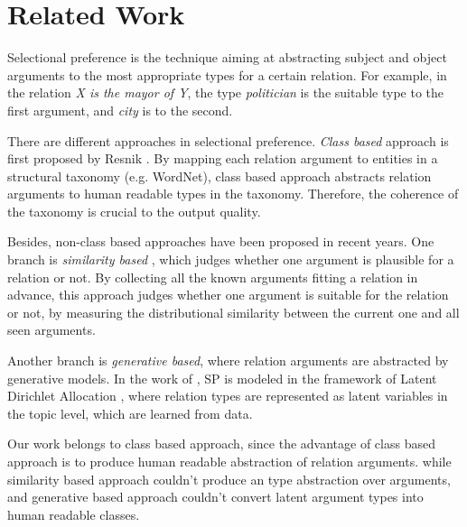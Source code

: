 \section{Related Work}


Selectional preference is the technique aiming at abstracting subject and object arguments to the most appropriate types for a certain relation.
For example, in the relation \textit{X is the mayor of Y}, the type \textit{politician} is the suitable type to the first argument, and \textit{city} is to the second.

There are different approaches in selectional preference.
\textit{Class based} approach is first proposed by Resnik .
By mapping each relation argument to entities in a structural taxonomy (e.g. WordNet), class based approach
abstracts relation arguments to human readable types in the taxonomy. Therefore, the coherence of the taxonomy
is crucial to the output quality.

Besides, non-class based approaches have been proposed in recent years.
One branch is \textit{similarity based} \cite{erk2007simple}, which judges whether one argument is plausible for a relation or not.
By collecting all the known arguments fitting a relation in advance, this approach judges whether one argument
is suitable for the relation or not, by measuring the distributional similarity between the current one and all seen arguments.

Another branch is \textit{generative based}, where relation arguments are abstracted by generative models.
In the work of , SP is modeled in the framework of Latent Dirichlet Allocation \cite{blei2003latent},
where relation types are represented as latent variables in the topic level, which are learned from data.

Our work belongs to class based approach, since the advantage of class based approach
is to produce human readable abstraction of relation arguments.
while similarity based approach couldn't produce an type abstraction over arguments,
and generative based approach couldn't convert latent argument types into human readable classes.




